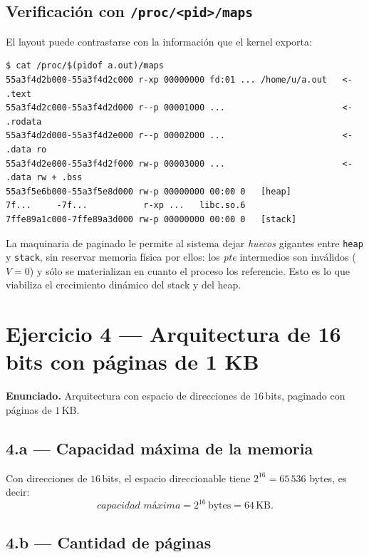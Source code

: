 \documentclass[11pt,a4paper]{article}
\begin{document}
\subsection{Verificación con \texttt{/proc/<pid>/maps}}

El layout puede contrastarse con la información que el kernel exporta:

\begin{lstlisting}[style=shellstyle]
$ cat /proc/$(pidof a.out)/maps
55a3f4d2b000-55a3f4d2c000 r-xp 00000000 fd:01 ... /home/u/a.out   <- .text
55a3f4d2c000-55a3f4d2d000 r--p 00001000 ...                       <- .rodata
55a3f4d2d000-55a3f4d2e000 r--p 00002000 ...                       <- .data ro
55a3f4d2e000-55a3f4d2f000 rw-p 00003000 ...                       <- .data rw + .bss
55a3f5e6b000-55a3f5e8d000 rw-p 00000000 00:00 0   [heap]
7f...     -7f...           r-xp ...   libc.so.6
7ffe89a1c000-7ffe89a3d000 rw-p 00000000 00:00 0   [stack]
\end{lstlisting}

\begin{idea}
La maquinaria de paginado le permite al sistema dejar \emph{huecos}
gigantes entre \texttt{heap} y \texttt{stack}, sin reservar memoria
física por ellos: los \emph{pte} intermedios son inválidos
($V=0$) y sólo se materializan en cuanto el proceso los referencie.
Esto es lo que viabiliza el crecimiento dinámico del stack y del heap.
\end{idea}

\section{Ejercicio 4 --- Arquitectura de 16 bits con páginas de 1 KB}

\textbf{Enunciado.} Arquitectura con espacio de direcciones de
$16$\,bits, paginado con páginas de $1$\,KB.

\subsection{4.a --- Capacidad máxima de la memoria}

Con direcciones de $16$\,bits, el espacio direccionable tiene
$2^{16} = 65\,536$ bytes, es decir:
\[
\boxed{\textit{capacidad máxima} = 2^{16}\,\text{bytes} = 64\,\text{KB}.}
\]

\subsection{4.b --- Cantidad de páginas}
\end{document}
